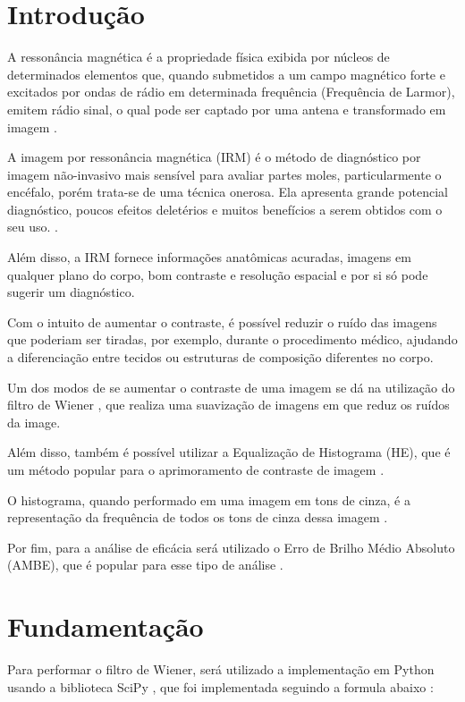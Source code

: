 \documentclass[conference]{IEEEtran}
\begin{document}
\section{Introdução}

A ressonância magnética é a propriedade física exibida por núcleos de determinados elementos que, quando submetidos a um campo magnético forte e excitados por ondas de rádio em determinada frequência (Frequência de Larmor), emitem rádio sinal, o qual pode ser captado por uma antena e transformado em imagem \cite{b1}. 

A imagem por ressonância magnética (IRM) é o método de diagnóstico por imagem não-invasivo mais sensível para avaliar partes moles, particularmente o encéfalo, porém trata-se de uma técnica onerosa. Ela apresenta grande potencial diagnóstico, poucos efeitos deletérios e muitos benefícios a serem obtidos com o seu uso. \cite{b2}.

Além disso, a IRM fornece informações anatômicas acuradas, imagens em qualquer plano do corpo, bom contraste e resolução espacial e por si só pode sugerir um diagnóstico\cite{b1}. 

Com o intuito de aumentar o contraste, é possível reduzir o ruído das imagens que poderiam ser tiradas, por exemplo, durante o procedimento médico, ajudando a diferenciação entre tecidos ou estruturas de composição diferentes no corpo\cite{b3}.

Um dos modos de se aumentar o contraste de uma imagem se dá na utilização do filtro de Wiener \cite{b4}, que realiza uma suavização de imagens em que reduz os ruídos da image.

Além disso, também é possível utilizar a Equalização de Histograma (HE), que é um método popular para o aprimoramento de contraste de imagem \cite{b7} \cite{b8} \cite{b9}.

O histograma, quando performado em uma imagem em tons de cinza, é a representação da frequência de todos os tons de cinza dessa imagem \cite{b10}.

Por fim, para a análise de eficácia será utilizado o Erro de Brilho Médio Absoluto (AMBE), que é popular para esse tipo de análise \cite{b12}.

\section{Fundamentação}

Para performar o filtro de Wiener, será utilizado a implementação em Python usando a biblioteca SciPy \cite{b5}, que foi implementada seguindo a formula abaixo \cite{b6} :
\end{document}
